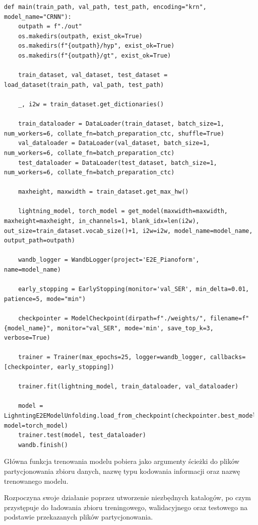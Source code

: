 \begin{lstlisting}[caption={Główna funkcja procesu uczenia modelu.}, label={model-training-main}]
def main(train_path, val_path, test_path, encoding="krn", model_name="CRNN"):
	outpath = f"./out"
	os.makedirs(outpath, exist_ok=True)
	os.makedirs(f"{outpath}/hyp", exist_ok=True)
	os.makedirs(f"{outpath}/gt", exist_ok=True)
	
	train_dataset, val_dataset, test_dataset = load_dataset(train_path, val_path, test_path)
	
	_, i2w = train_dataset.get_dictionaries()
	
	train_dataloader = DataLoader(train_dataset, batch_size=1, num_workers=6, collate_fn=batch_preparation_ctc, shuffle=True)
	val_dataloader = DataLoader(val_dataset, batch_size=1, num_workers=6, collate_fn=batch_preparation_ctc)
	test_dataloader = DataLoader(test_dataset, batch_size=1, num_workers=6, collate_fn=batch_preparation_ctc)
	
	maxheight, maxwidth = train_dataset.get_max_hw()
	
	lightning_model, torch_model = get_model(maxwidth=maxwidth, maxheight=maxheight, in_channels=1, blank_idx=len(i2w), out_size=train_dataset.vocab_size()+1, i2w=i2w, model_name=model_name, output_path=outpath)
	
	wandb_logger = WandbLogger(project='E2E_Pianoform', name=model_name)
	
	early_stopping = EarlyStopping(monitor='val_SER', min_delta=0.01, patience=5, mode="min")
	
	checkpointer = ModelCheckpoint(dirpath=f"./weights/", filename=f"{model_name}", monitor="val_SER", mode='min', save_top_k=3, verbose=True)
	
	trainer = Trainer(max_epochs=25, logger=wandb_logger, callbacks=[checkpointer, early_stopping])
	
	trainer.fit(lightning_model, train_dataloader, val_dataloader)
	
	model = LighntingE2EModelUnfolding.load_from_checkpoint(checkpointer.best_model_path, model=torch_model)
	trainer.test(model, test_dataloader)
	wandb.finish()
\end{lstlisting}

Główna funkcja trenowania modelu pobiera jako argumenty ścieżki do plików partycjonowania zbioru danych, nazwę typu kodowania informacji oraz nazwę trenowanego modelu.

Rozpoczyna swoje działanie poprzez utworzenie niezbędnych katalogów, po czym przystępuje do ładowania zbioru treningowego, walidacyjnego oraz testowego na podstawie przekazanych plików partycjonowania. 

